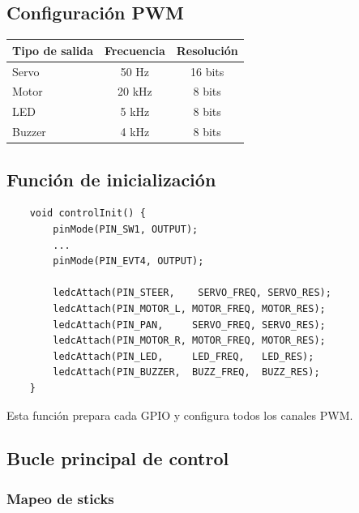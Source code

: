 \documentclass[12pt,a4paper]{article}
\begin{document}
\subsection{Configuración PWM}
\begin{center}
	\renewcommand{\arraystretch}{1.3}
	\setlength{\tabcolsep}{12pt}
	
	\begin{tabular}{@{} l c c @{}}
		\toprule
		\rowcolor{tableHeader!20}
		\textbf{Tipo de salida} & \textbf{Frecuencia} & \textbf{Resolución} \\
		\midrule
		
		Servo                & 50 Hz              & 16 bits             \\
		Motor                & 20 kHz             & 8 bits              \\
		LED                  & 5 kHz              & 8 bits              \\
		Buzzer               & 4 kHz              & 8 bits              \\
		
		\bottomrule
	\end{tabular}
\end{center}

\subsection{Función de inicialización}

\begin{lstlisting}
	void controlInit() {
		pinMode(PIN_SW1, OUTPUT);
		...
		pinMode(PIN_EVT4, OUTPUT);
		
		ledcAttach(PIN_STEER,    SERVO_FREQ, SERVO_RES);
		ledcAttach(PIN_MOTOR_L, MOTOR_FREQ, MOTOR_RES);
		ledcAttach(PIN_PAN,     SERVO_FREQ, SERVO_RES);
		ledcAttach(PIN_MOTOR_R, MOTOR_FREQ, MOTOR_RES);
		ledcAttach(PIN_LED,     LED_FREQ,   LED_RES);
		ledcAttach(PIN_BUZZER,  BUZZ_FREQ,  BUZZ_RES);
	}
\end{lstlisting}

Esta función prepara cada GPIO y configura todos los canales PWM.

\subsection{Bucle principal de control}

\subsubsection{Mapeo de sticks}
\end{document}
